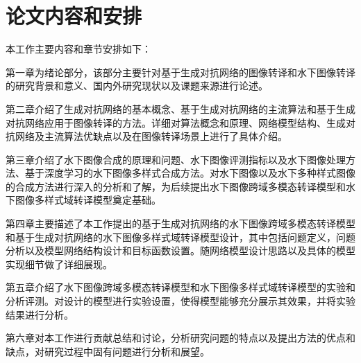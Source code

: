 \section{论文内容和安排}
本工作主要内容和章节安排如下：

第一章为绪论部分，该部分主要针对基于生成对抗网络的图像转译和水下图像转译的研究背景和意义、国内外研究现状以及课题来源进行论述。

第二章介绍了生成对抗网络的基本概念、基于生成对抗网络的主流算法和基于生成对抗网络应用于图像转译的方法。详细对算法概念和原理、网络模型结构、生成对抗网络及主流算法优缺点以及在图像转译场景上进行了具体介绍。

第三章介绍了水下图像合成的原理和问题、水下图像评测指标以及水下图像处理方法、基于深度学习的水下图像多样式合成方法。对水下图像以及水下多种样式图像的合成方法进行深入的分析和了解，为后续提出水下图像跨域多模态转译模型和水下图像多样式域转译模型奠定基础。

第四章主要描述了本工作提出的基于生成对抗网络的水下图像跨域多模态转译模型和基于生成对抗网络的水下图像多样式域转译模型设计，其中包括问题定义，问题分析以及模型网络结构设计和目标函数设置。随网络模型设计思路以及具体的模型实现细节做了详细展现。

第五章介绍了水下图像跨域多模态转译模型和水下图像多样式域转译模型的实验和分析评测。对设计的模型进行实验设置，使得模型能够充分展示其效果，并将实验结果进行分析。

第六章对本工作进行贡献总结和讨论，分析研究问题的特点以及提出方法的优点和缺点，对研究过程中固有问题进行分析和展望。
